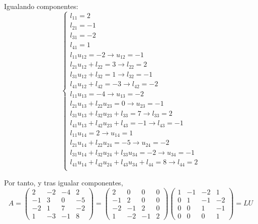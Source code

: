 \begin{ejercicio}
\begin{enumerate}
    Igualando componentes:
    \begin{equation*}
    \left\{ \begin{array}{l}
         l_{11} = 2 \\ 
         l_{21} = -1 \\
         l_{31} = -2 \\
         l_{41} = 1 \\
         l_{11}u_{12} = -2 \longrightarrow u_{12}=-1 \\
         l_{21}u_{12} + l_{22} = 3 \longrightarrow l_{22}=2\\
         l_{31}u_{12} + l_{32} = 1 \longrightarrow l_{32}=-1 \\
         l_{41}u_{12} + l_{42} = -3 \longrightarrow l_{42}=-2 \\
         l_{11}u_{13} = -4 \longrightarrow u_{13}=-2 \\
         l_{21}u_{13} + l_{22}u_{23} = 0 \longrightarrow u_{23} = -1\\
         l_{31}u_{13} + l_{32}u_{23} + l_{33} = 7 \longrightarrow l_{33} = 2 \\
         l_{41}u_{13} + l_{42}u_{23} + l_{43} = -1 \longrightarrow l_{43} = -1 \\
         l_{11}u_{14} = 2 \longrightarrow u_{14}=1 \\
         l_{21}u_{14} + l_{22}u_{24} = -5 \longrightarrow u_{24}=-2\\
         l_{31}u_{14} + l_{32}u_{24} + l_{33}u_{34} = -2 \longrightarrow u_{34} = -1 \\
         l_{41}u_{14} + l_{42}u_{24} + l_{43}u_{34} + l_{44} = 8 \longrightarrow l_{44} = 2\\
    \end{array}\right.
    \end{equation*}

    Por tanto, y tras igualar componentes,
    \begin{equation*}
        A = \left(
        \begin{array}{cccc}
            2 & -2 & -4 & 2 \\
            -1 & 3 & 0 & -5 \\
            -2 & 1 & 7 & -2 \\
            1 & -3 & -1 & 8
        \end{array}\right)
        = \left(
        \begin{array}{cccc}
            2 & 0 & 0 & 0\\
            -1 & 2 & 0 & 0\\
            -2 & -1 & 2 & 0\\
            1 & -2 & -1 & 2
        \end{array}\right) \left(
        \begin{array}{cccc}
            1 & -1 & -2 & 1\\
            0 & 1 & -1 & -2\\
            0 & 0 & 1 & -1\\
            0 & 0 & 0 & 1
        \end{array}\right) = LU
    \end{equation*}


\end{enumerate}
\end{ejercicio}
